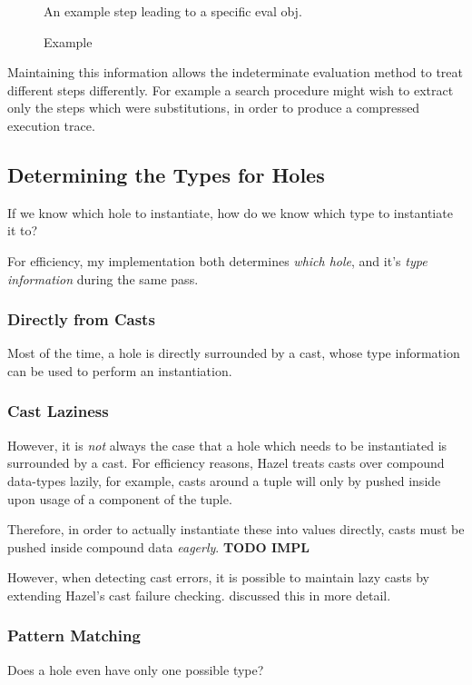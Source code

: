 \begin{figure}
An example step leading to a specific eval obj.
\caption{ Example}
\label{fig:EvalObjExample)}
\end{figure}

Maintaining this information allows the indeterminate evaluation method to treat different steps differently. For example a search procedure might wish to extract only the steps which were substitutions, in order to produce a compressed execution trace.

\subsection{Determining the Types for Holes}
\label{sec:TypesForHoles}
If we know which hole to instantiate, how do we know which type to instantiate it to?

For efficiency, my implementation both determines \textit{which hole}, and it's \textit{type information} during the same pass.

\subsubsection{Directly from Casts}
Most of the time, a hole is directly surrounded by a cast, whose type information can be used to perform an instantiation.

\subsubsection{Cast Laziness}\label{sec:CastLaziness}
However, it is \textit{not} always the case that a hole which needs to be instantiated is surrounded by a cast. For efficiency reasons, Hazel treats casts over compound data-types lazily, for example, casts around a tuple will only by pushed inside upon usage of a component of the tuple.

Therefore, in order to actually instantiate these into values directly, casts must be pushed inside compound data \textit{eagerly}. \textbf{TODO IMPL}

However, when detecting cast errors, it is possible to maintain lazy casts by extending Hazel's cast failure checking.  discussed this in more detail.


\subsubsection{Pattern Matching}
\label{sec:PatternMatching}
Does a hole even have only one possible type?

